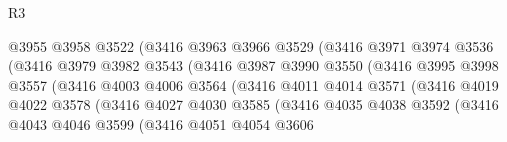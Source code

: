 \begin{lexlean}{R3}
\begin{coremodule}
                                  @3955
                                  @3958
                                  @3522
                                  (@3416
                                    @3963
                                    @3966
                                    @3529
                                    (@3416
                                      @3971
                                      @3974
                                      @3536
                                      (@3416
                                        @3979
                                        @3982
                                        @3543
                                        (@3416
                                          @3987
                                          @3990
                                          @3550
                                          (@3416
                                            @3995
                                            @3998
                                            @3557
                                            (@3416
                                              @4003
                                              @4006
                                              @3564
                                              (@3416
                                                @4011
                                                @4014
                                                @3571
                                                (@3416
                                                  @4019
                                                  @4022
                                                  @3578
                                                  (@3416
                                                    @4027
                                                    @4030
                                                    @3585
                                                    (@3416
                                                      @4035
                                                      @4038
                                                      @3592
                                                      (@3416
                                                        @4043
                                                        @4046
                                                        @3599
                                                        (@3416
                                                          @4051
                                                          @4054
                                                          @3606

\end{coremodule}
\end{lexlean}
